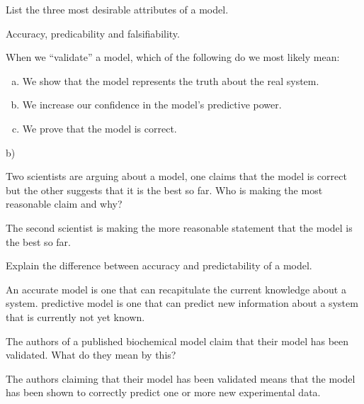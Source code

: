 \documentclass[12pt]{article}
\begin{document}
\begin{question}
List the three most desirable attributes of a model.
\end{question}
\begin{solution}
Accuracy, predicability and falsifiability.
\end{solution}



\begin{question}
When we ``validate'' a model, which of the following do we most likely mean:
\begin{enumerate}[a)]
\item We show that the model represents the truth about the real system.
\item We increase our confidence in the model's predictive power.
\item We prove that the model is correct.
\end{enumerate}
\end{question}
\begin{solution}
b)
\end{solution}



\begin{question}
Two scientists are arguing about a model, one claims that the model is correct but the other suggests that it is the best so far. Who is making the most reasonable claim and why?
\end{question}
\begin{solution}
The second scientist is making the more reasonable statement that the model is the best so far.
\end{solution}


\begin{question}
Explain the difference between accuracy and predictability of a model.
\end{question}
\begin{solution}
An accurate model is one that can recapitulate the current knowledge about a system.  predictive model is one that can predict new information about a system that is currently not yet known.
\end{solution}


\begin{question}
The authors of a published biochemical model claim that their model has been validated. What do they mean by this?
\end{question}
\begin{solution}
 The authors claiming that their model has been validated means that the model has been shown to correctly predict one or more new experimental data.
\end{solution}
\end{document}
